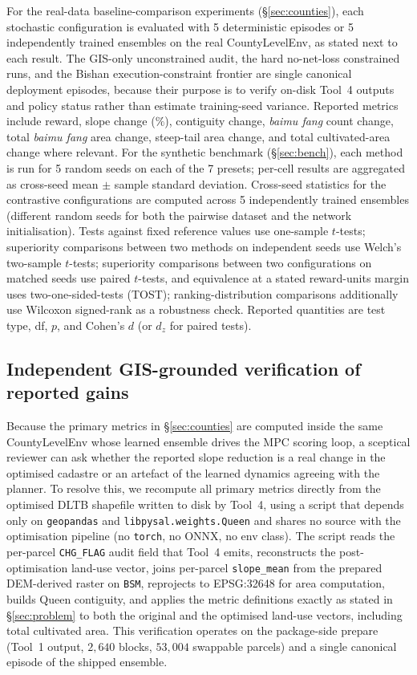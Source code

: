 \documentclass[11pt]{article}
\begin{document}
For the real-data baseline-comparison experiments (\S\ref{sec:counties}), each stochastic configuration is evaluated with 5 deterministic episodes or 5 independently trained ensembles on the real CountyLevelEnv, as stated next to each result. The GIS-only unconstrained audit, the hard no-net-loss constrained runs, and the Bishan execution-constraint frontier are single canonical deployment episodes, because their purpose is to verify on-disk Tool~4 outputs and policy status rather than estimate training-seed variance. Reported metrics include reward, slope change ($\%$), contiguity change, \textit{baimu fang} count change, total \textit{baimu fang} area change, steep-tail area change, and total cultivated-area change where relevant. For the synthetic benchmark (\S\ref{sec:bench}), each method is run for 5 random seeds on each of the 7 presets; per-cell results are aggregated as cross-seed mean $\pm$ sample standard deviation. Cross-seed statistics for the contrastive configurations are computed across 5 independently trained ensembles (different random seeds for both the pairwise dataset and the network initialisation). Tests against fixed reference values use one-sample $t$-tests; superiority comparisons between two methods on independent seeds use Welch's two-sample $t$-tests; superiority comparisons between two configurations on matched seeds use paired $t$-tests, and equivalence at a stated reward-units margin uses two-one-sided-tests (TOST); ranking-distribution comparisons additionally use Wilcoxon signed-rank as a robustness check. Reported quantities are test type, df, $p$, and Cohen's $d$ (or $d_z$ for paired tests).

\subsection{Independent GIS-grounded verification of reported gains}\label{sec:methods-validate}

Because the primary metrics in \S\ref{sec:counties} are computed inside the same CountyLevelEnv whose learned ensemble drives the MPC scoring loop, a sceptical reviewer can ask whether the reported slope reduction is a real change in the optimised cadastre or an artefact of the learned dynamics agreeing with the planner. To resolve this, we recompute all primary metrics directly from the optimised DLTB shapefile written to disk by Tool~4, using a script that depends only on \texttt{geopandas} and \texttt{libpysal.weights.Queen} and shares no source with the optimisation pipeline (no \texttt{torch}, no ONNX, no env class). The script reads the per-parcel \texttt{CHG\_FLAG} audit field that Tool~4 emits, reconstructs the post-optimisation land-use vector, joins per-parcel \texttt{slope\_mean} from the prepared DEM-derived raster on \texttt{BSM}, reprojects to EPSG:32648 for area computation, builds Queen contiguity, and applies the metric definitions exactly as stated in \S\ref{sec:problem} to both the original and the optimised land-use vectors, including total cultivated area. This verification operates on the package-side prepare (Tool~1 output, $2{,}640$ blocks, $53{,}004$ swappable parcels) and a single canonical episode of the shipped ensemble.
\end{document}
